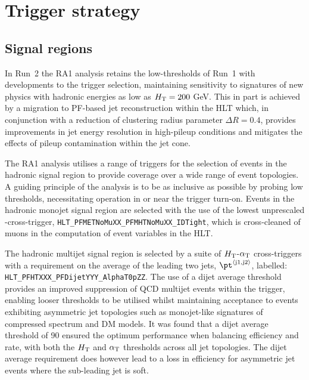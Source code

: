\section{Trigger strategy}
\label{sec:triggers}

\subsection{Signal regions\label{sec:hadronic_signal_region}}

In Run~2 the RA1 analysis retains the low-thresholds of Run~1 with developments 
to the trigger selection, maintaining sensitivity to signatures of new physics with hadronic 
energies as low as $\mbox{$H_\text{T}$} = 200$ GeV. This in part is achieved by a migration to PF-based 
jet reconstruction within the HLT which, in conjunction with a reduction of clustering radius 
parameter $\Delta R = 0.4$, provides improvements in jet energy resolution in high-pileup 
conditions and mitigates the effects of pileup contamination within the jet cone.

The RA1 analysis utilises a range of triggers for the selection of events in the hadronic signal region
to provide coverage over a wide range of event topologies. A guiding principle of the analysis is to be as
inclusive as possible by probing low thresholds, necessitating operation in or near the trigger turn-on.
Events in the hadronic monojet signal region are selected with the use of the
lowest unprescaled \mht-\met cross-trigger, 
\verb!HLT_PFMETNoMuXX_PFMHTNoMuXX_IDTight!, which is cross-cleaned of muons in the computation 
of event variables in the HLT.

The hadronic multijet signal region is selected by a suite of $\mbox{$H_\text{T}$}$-$\alpha_{\text{T}}$ cross-triggers 
with a requirement on the average \pt of the leading two jets, $\pt^{\rm \left<j1,j2\right>}$, labelled: 
\verb!HLT_PFHTXXX_PFDijetYYY_AlphaT0pZZ!. The use of a dijet average threshold provides an improved 
suppression of QCD multijet events within the trigger,
enabling looser \alphat thresholds to be utilised whilst maintaining acceptance to events exhibiting asymmetric jet 
topologies such as monojet-like signatures of compressed spectrum and DM models. It was found that a dijet average
threshold of 90 \GeV ensured the optimum performance when balancing efficiency and rate, with both the $\mbox{$H_\text{T}$}$ and $\alpha_{\text{T}}$
thresholds across all jet topologies. The dijet average requirement does however lead to a loss in efficiency for 
asymmetric jet events where the sub-leading jet is soft.

